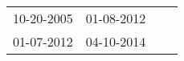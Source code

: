 \begin{supertabular}{llll}
 10-20-2005 &  01-08-2012 \\
 01-07-2012 &  04-10-2014 \\
\end{supertabular}
